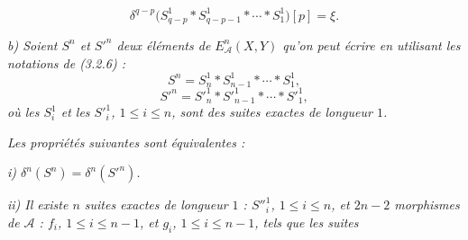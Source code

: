 \begin{equation}
\delta^{q-p}\bigl(S_{q-p}^1*S_{q-p-1}^1*\cdots*S_1^1\bigr)[p]=\xi.
\tag{3.3.1.1}
\end{equation}

\noindent\textit{b) Soient $S^n$ et ${S'}^n$ deux éléments de
$E_{\mathcal A}^{n}(X,Y)$ qu'on peut écrire en utilisant les notations de
(3.2.6) :}
\[
S^n=S_n^1*S_{n-1}^1*\cdots*S_1^1,
\]
\[
{S'}^n={S'}_n^1*{S'}_{n-1}^1*\cdots*{S'}_1^1,
\]
\noindent\textit{où les $S_i^1$ et les ${S'}_i^1$, $1\leq i\leq n$, sont
des suites exactes de longueur $1$.}

\noindent\textit{Les propriétés suivantes sont équivalentes :}

\noindent\textit{i) $\delta^n(S^n)=\delta^n({S'}^n)$.}

\noindent\textit{ii) Il existe $n$ suites exactes de longueur $1$ :
${S''}_i^1$, $1\leq i\leq n$, et $2n-2$ morphismes de $\mathcal A$ :
$f_i$, $1\leq i\leq n-1$, et $g_i$, $1\leq i\leq n-1$, tels que les suites}
\endgroup
